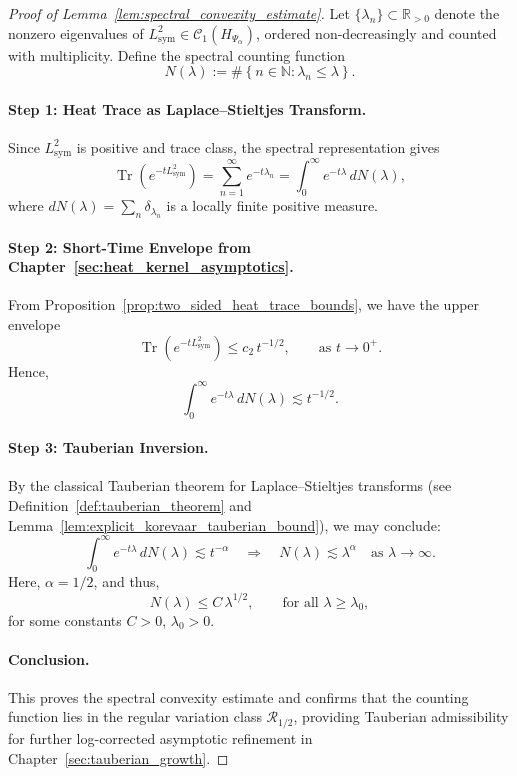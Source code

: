 \begin{proof}[Proof of Lemma~\ref{lem:spectral_convexity_estimate}]
Let \( \{ \lambda_n \} \subset \mathbb{R}_{>0} \) denote the nonzero eigenvalues of \( L_{\mathrm{sym}}^2 \in \mathcal{C}_1(H_{\Psi_\alpha}) \), ordered non-decreasingly and counted with multiplicity. Define the spectral counting function
\[
N(\lambda) := \#\left\{ n \in \mathbb{N} : \lambda_n \le \lambda \right\}.
\]

\paragraph{Step 1: Heat Trace as Laplace–Stieltjes Transform.}
Since \( L_{\mathrm{sym}}^2 \) is positive and trace class, the spectral representation gives
\[
\operatorname{Tr}(e^{-t L_{\mathrm{sym}}^2}) = \sum_{n=1}^\infty e^{-t \lambda_n}
= \int_0^\infty e^{-t\lambda} \, dN(\lambda),
\]
where \( dN(\lambda) = \sum_n \delta_{\lambda_n} \) is a locally finite positive measure.

\paragraph{Step 2: Short-Time Envelope from Chapter~\ref{sec:heat_kernel_asymptotics}.}
From Proposition~\ref{prop:two_sided_heat_trace_bounds}, we have the upper envelope
\[
\operatorname{Tr}(e^{-t L_{\mathrm{sym}}^2}) \leq c_2 \, t^{-1/2}, \qquad \text{as } t \to 0^+.
\]
Hence,
\[
\int_0^\infty e^{-t\lambda} \, dN(\lambda) \lesssim t^{-1/2}.
\]

\paragraph{Step 3: Tauberian Inversion.}
By the classical Tauberian theorem for Laplace–Stieltjes transforms (see Definition~\ref{def:tauberian_theorem} and Lemma~\ref{lem:explicit_korevaar_tauberian_bound}), we may conclude:
\[
\int_0^\infty e^{-t\lambda} \, dN(\lambda) \lesssim t^{-\alpha} \quad \Longrightarrow \quad N(\lambda) \lesssim \lambda^{\alpha} \quad \text{as } \lambda \to \infty.
\]
Here, \( \alpha = 1/2 \), and thus,
\[
N(\lambda) \leq C\, \lambda^{1/2}, \qquad \text{for all } \lambda \ge \lambda_0,
\]
for some constants \( C > 0 \), \( \lambda_0 > 0 \).

\paragraph{Conclusion.}
This proves the spectral convexity estimate and confirms that the counting function lies in the regular variation class \( \mathcal{R}_{1/2} \), providing Tauberian admissibility for further log-corrected asymptotic refinement in Chapter~\ref{sec:tauberian_growth}.
\end{proof}
